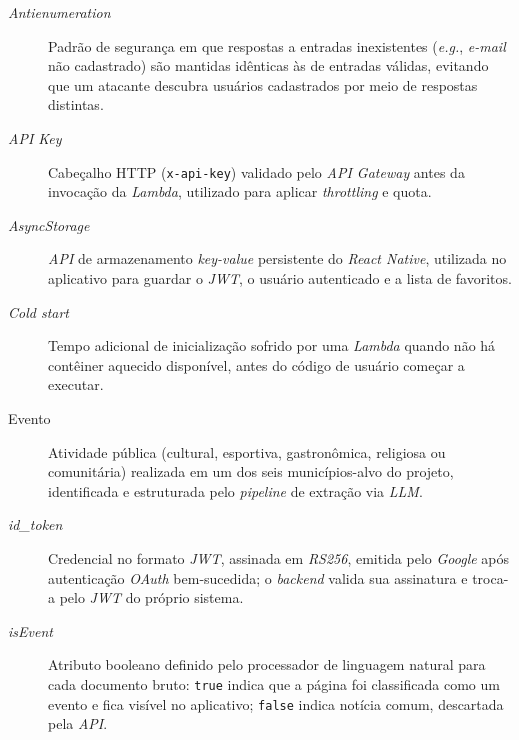 

\begin{description}

\item[\textit{Antienumeration}] Padrão de segurança em que respostas a entradas inexistentes (\textit{e.g.}, \textit{e-mail} não cadastrado) são mantidas idênticas às de entradas válidas, evitando que um atacante descubra usuários cadastrados por meio de respostas distintas.

\item[\textit{API Key}] Cabeçalho HTTP (\texttt{x-api-key}) validado pelo \textit{API Gateway} antes da invocação da \textit{Lambda}, utilizado para aplicar \textit{throttling} e quota.

\item[\textit{AsyncStorage}] \textit{API} de armazenamento \textit{key-value} persistente do \textit{React Native}, utilizada no aplicativo para guardar o \textit{JWT}, o usuário autenticado e a lista de favoritos.

\item[\textit{Cold start}] Tempo adicional de inicialização sofrido por uma \textit{Lambda} quando não há contêiner aquecido disponível, antes do código de usuário começar a executar.

\item[Evento] Atividade pública (cultural, esportiva, gastronômica, religiosa ou comunitária) realizada em um dos seis municípios-alvo do projeto, identificada e estruturada pelo \textit{pipeline} de extração via \textit{LLM}.

\item[\textit{id\_token}] Credencial no formato \textit{JWT}, assinada em \textit{RS256}, emitida pelo \textit{Google} após autenticação \textit{OAuth} bem-sucedida; o \textit{backend} valida sua assinatura e troca-a pelo \textit{JWT} do próprio sistema.

\item[\textit{isEvent}] Atributo booleano definido pelo processador de linguagem natural para cada documento bruto: \texttt{true} indica que a página foi classificada como um evento e fica visível no aplicativo; \texttt{false} indica notícia comum, descartada pela \textit{API}.


\end{description}
